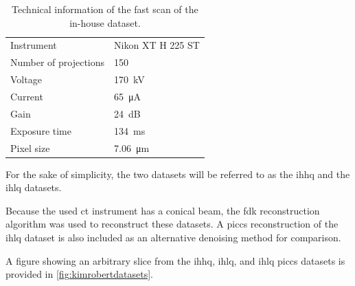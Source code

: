 \begin{table}[htbp]
    \centering
    \caption[Technical information of the IHLQ soda lime glass spheres dataset]{Technical information of the fast scan of the in-house dataset. }
    \label{tab:inhouselq}
    \begin{tabular}{ll}
    \hline
    Instrument & Nikon XT H 225 ST \\
    Number of projections & 150 \\
    Voltage & \SI{170}{\kilo \volt}\\
    Current & \SI{65}{\micro \ampere}\\
    Gain & \SI{24}{\deci \bel}\\
    Exposure time & \SI{134}{\milli \second}\\
    Pixel size & \SI{7.06}{\micro \meter} \\
    \hline
    \end{tabular}
\end{table}

For the sake of simplicity, the two datasets will be referred to as the \gls{ihhq} and the \gls{ihlq} datasets. 

Because the used \gls{ct} instrument has a conical beam, the \gls{fdk} reconstruction algorithm was used to reconstruct these datasets. A \gls{piccs} reconstruction of the \gls{ihlq} dataset is also included as an alternative denoising method for comparison. 

A figure showing an arbitrary slice from the \gls{ihhq}, \gls{ihlq}, and \gls{ihlq} \gls{piccs} datasets is provided in \cref{fig:kimrobertdatasets}.

